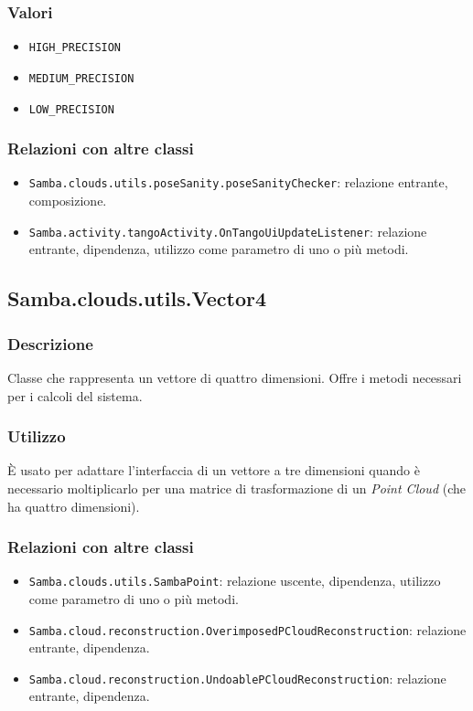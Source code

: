 \subsubsection{Valori}
\begin{itemize}
	\item \texttt{HIGH\_PRECISION}
	\item \texttt{MEDIUM\_PRECISION}
	\item \texttt{LOW\_PRECISION}		
\end{itemize}
\subsubsection{Relazioni con altre classi}
\begin{itemize}
	\item \texttt{Samba.clouds.utils.poseSanity.poseSanityChecker}: relazione entrante, composizione.
	\item \texttt{Samba.activity.tangoActivity.OnTangoUiUpdateListener}: relazione entrante, dipendenza, utilizzo come parametro di uno o più metodi.
\end{itemize}

\subsection{Samba.clouds.utils.Vector4}
\subsubsection{Descrizione}
Classe che rappresenta un vettore di quattro dimensioni. Offre i metodi necessari per i calcoli del sistema.
\subsubsection{Utilizzo}
È usato per adattare l'interfaccia di un vettore a tre dimensioni quando è necessario moltiplicarlo per una matrice di trasformazione di un \emph{Point Cloud} (che ha quattro dimensioni).
\subsubsection{Relazioni con altre classi}
\begin{itemize}
	\item \texttt{Samba.clouds.utils.SambaPoint}: relazione uscente, dipendenza, utilizzo come parametro di uno o più metodi.
	\item \texttt{Samba.cloud.reconstruction.OverimposedPCloudReconstruction}: relazione entrante, dipendenza.
	\item \texttt{Samba.cloud.reconstruction.UndoablePCloudReconstruction}: relazione entrante, dipendenza.	
\end{itemize}

